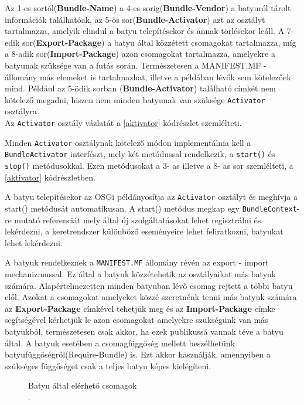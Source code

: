 Az 1-es sortól(\textbf{Bundle-Name}) a 4-es sorig(\textbf{Bundle-Vendor}) a batyuról tárolt információk találhatóak, az 5-ös sor(\textbf{Bundle-Activator}) azt az osztályt tartalmazza, amelyik elindul a batyu telepítésekor és annak törlésekor leáll. A 7-edik sor(\textbf{Export-Package}) a batyu által közzétett csomagokat tartalmazza, míg a 8-adik sor(\textbf{Import-Package}) azon csomagokat tartalmazza, amelyekre a batyunak szüksége van a futás során. Természetesen a MANIFEST.MF - állomány más elemeket is tartalmazhat, illetve a példában lévők sem kötelezőek mind. Például az  5-ödik sorban (\textbf{Bundle-Activator}) található címkét nem kötelező megadni, hiszen nem minden batyunak van szüksége \texttt{Activator} osztályra. \\ Az \texttt{Activator} osztály vázlatát a \ref{aktivator} kódrészlet szemlélteti.
\
%


Minden \texttt{Activator} osztálynak kötelező módon implementálnia kell a \texttt{BundleActivator} interfészt, mely két metódussal rendelkezik, a \texttt{start()} és \texttt{stop()} metódusokkal. Ezen metódusokat a 3- as illetve a 8- as sor szemlélteti, a \ref{aktivator} kódrészletben.

A batyu telepítésekor az OSGi példányosítja az \texttt{Activator} osztályt és meghívja a start() metódusát automatikusan. A start() metódus megkap egy \texttt{BundleContext}- re mutató referenciát mely által új szolgáltatásokat lehet regisztrálni és lekérdezni, a keretrendszer különböző eseményeire lehet feliratkozni, batyukat lehet lekérdezni.


A batyuk rendelkeznek a \texttt{MANIFEST.MF} állomány révén az export - import mechanizmussal. Ez által a batyuk közzétehetik az osztályaikat más batyuk számára. Alapértelmezetten minden batyuban lévő csomag rejtett a többi batyu elől. Azokat a csomagokat amelyeket közzé szeretnénk tenni más batyuk számára az \textbf{Export-Package} címkével tehetjük meg és az \textbf{Import-Package} címke segítségével kérhetjük le azon csomagokat amelyekre szükségünk van más batyukból, természetesen csak akkor, ha ezek publikussá vannak téve a batyu által. A batyuk esetében a csomagfüggőség mellett beszélhetünk batyufüggőségről(Require-Bundle) is. Ezt akkor használják, amennyiben a szükséges függőséget csak a teljes batyu képes kielégíteni.


\begin{figure}[h!]
  \centering
  \caption[Batyuk elerese]%
  {Batyu által elérhető csomagok\\
  {\white .}\hfill\url{}}
  \label{fig:BatyukElerese}
\end{figure}


